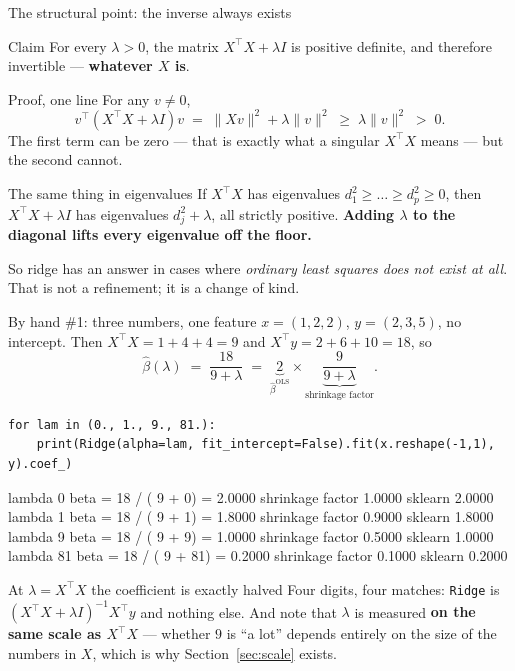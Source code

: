 \documentclass[aspectratio=169]{beamer}
\begin{document}
\begin{frame}[shrink=6]{The structural point: the inverse always exists}
  \begin{block}{Claim}
    For every $\lambda > 0$, the matrix $X^{\!\top}\!X + \lambda I$ is
    positive definite, and therefore invertible --- \textbf{whatever $X$ is}.
  \end{block}
  \begin{block}{Proof, one line}
    For any $v \ne 0$,
    \[
      v^{\!\top}(X^{\!\top}\!X + \lambda I)v
      \;=\; \|Xv\|^2 + \lambda\|v\|^2 \;\ge\; \lambda\|v\|^2 \;>\; 0 .
    \]
    \small The first term can be zero --- that is exactly what a singular
    $X^{\!\top}\!X$ means --- but the second cannot.
  \end{block}
  \begin{exampleblock}{The same thing in eigenvalues}
    \small If $X^{\!\top}\!X$ has eigenvalues $d_1^2 \ge \dots \ge d_p^2 \ge 0$,
    then $X^{\!\top}\!X + \lambda I$ has eigenvalues $d_j^2 + \lambda$, all
    strictly positive. \textbf{Adding $\lambda$ to the diagonal lifts every
    eigenvalue off the floor.}
  \end{exampleblock}
  \begin{center}\small
    So ridge has an answer in cases where \emph{ordinary least squares does
    not exist at all}. That is not a refinement; it is a change of kind.
  \end{center}
\end{frame}

\begin{frame}[fragile,shrink=10]{By hand \#1: three numbers, one feature}
  $x = (1, 2, 2)$, $y = (2, 3, 5)$, no intercept. Then
  $X^{\!\top}\!X = 1 + 4 + 4 = 9$ and $X^{\!\top}y = 2 + 6 + 10 = 18$, so
  \[
    \hat\beta(\lambda) \;=\; \frac{18}{9 + \lambda}
    \;=\; \underbrace{2}_{\hat\beta^{\mathrm{OLS}}}
      \times \underbrace{\frac{9}{9+\lambda}}_{\text{shrinkage factor}} .
  \]
\begin{lstlisting}
for lam in (0., 1., 9., 81.):
    print(Ridge(alpha=lam, fit_intercept=False).fit(x.reshape(-1,1), y).coef_)
\end{lstlisting}
\begin{outblk}
  lambda     0   beta = 18 / ( 9 +  0) = 2.0000   shrinkage factor 1.0000   sklearn 2.0000
  lambda     1   beta = 18 / ( 9 +  1) = 1.8000   shrinkage factor 0.9000   sklearn 1.8000
  lambda     9   beta = 18 / ( 9 +  9) = 1.0000   shrinkage factor 0.5000   sklearn 1.0000
  lambda    81   beta = 18 / ( 9 + 81) = 0.2000   shrinkage factor 0.1000   sklearn 0.2000
\end{outblk}
\begin{alertblock}{At $\lambda = X^{\!\top}\!X$ the coefficient is exactly halved}
  \footnotesize Four digits, four matches: \texttt{Ridge} is
  $(X^{\!\top}\!X+\lambda I)^{-1}X^{\!\top}y$ and nothing else. And note that
  $\lambda$ is measured \textbf{on the same scale as $X^{\!\top}\!X$} ---
  whether $9$ is ``a lot'' depends entirely on the size of the numbers in
  $X$, which is why Section~\ref{sec:scale} exists.
\end{alertblock}
\end{frame}
\end{document}
